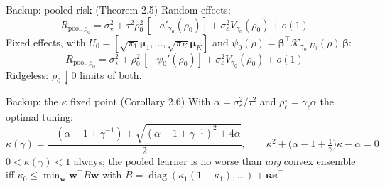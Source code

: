 \documentclass[aspectratio=169,11pt]{beamer}
\newcommand{\bbeta}{\bm{\beta}}
\newcommand{\bmu}{\bm{\mu}}
\begin{document}
\begin{frame}{Backup: pooled risk (Theorem 2.5)}
  \small
  Random effects:
  \[
    R_{\mathrm{pool},\rho_0} = \sigma_\star^2 + \tau^2\rho_0^2\,[-a'_{\gamma_0}(\rho_0)] + \sigma_\varepsilon^2 V_{\gamma_0}(\rho_0) + o(1)
  \]
  Fixed effects, with $U_0 = [\sqrt{\pi_1}\bmu_1, \ldots, \sqrt{\pi_K}\bmu_K]$ and $\psi_0(\rho) = \bbeta^\top \mathcal{K}_{\gamma_0, U_0}(\rho)\,\bbeta$:
  \[
    R_{\mathrm{pool},\rho_0} = \sigma_\star^2 + \rho_0^2\,[-\psi_0'(\rho_0)] + \sigma_\varepsilon^2 V_{\gamma_0}(\rho_0) + o(1)
  \]
  Ridgeless: $\rho_0 \downarrow 0$ limits of both.
\end{frame}

\begin{frame}{Backup: the $\kappa$ fixed point (Corollary 2.6)}
  \small
  With $\alpha = \sigma_\varepsilon^2 / \tau^2$ and $\rho^\star_\ell = \gamma_\ell\alpha$ the optimal tuning:
  \[
    \kappa(\gamma) = \frac{-(\alpha - 1 + \gamma^{-1}) + \sqrt{(\alpha - 1 + \gamma^{-1})^2 + 4\alpha}}{2},
    \qquad
    \kappa^2 + \Big(\alpha - 1 + \tfrac{1}{\gamma}\Big)\kappa - \alpha = 0
  \]
  $0 < \kappa(\gamma) < 1$ always; the pooled learner is no worse than \emph{any} convex ensemble iff
  $\kappa_0 \le \min_{\bm w} \bm w^\top B \bm w$ with
  $B = \operatorname{diag}(\kappa_1(1-\kappa_1), \ldots) + \bm\kappa\bm\kappa^\top$.
\end{frame}
\end{document}
